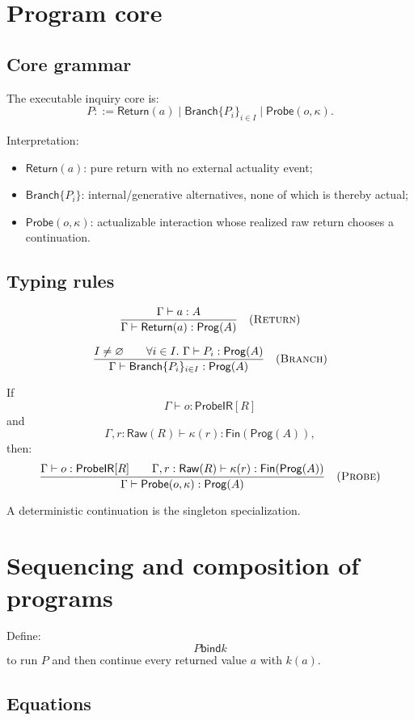 \documentclass[11pt,oneside]{article}
\newcommand{\Prog}{\mathsf{Prog}}
\newcommand{\Raw}{\mathsf{Raw}}
\newcommand{\ProbeIR}{\mathsf{ProbeIR}}
\newcommand{\bind}{\mathbin{\mathsf{bind}}}
\begin{document}
\section{Program core}

\subsection{Core grammar}

The executable inquiry core is:
\[
\boxed{
P::=
\mathsf{Return}(a)
\mid
\mathsf{Branch}\{P_i\}_{i\in I}
\mid
\mathsf{Probe}(o,\kappa).
}
\]

Interpretation:
\begin{itemize}
\item \(\mathsf{Return}(a)\): pure return with no external actuality event;
\item \(\mathsf{Branch}\{P_i\}\): internal/generative alternatives, none of which is thereby actual;
\item \(\mathsf{Probe}(o,\kappa)\): actualizable interaction whose realized raw return chooses a continuation.
\end{itemize}

\subsection{Typing rules}

\[
\frac{\Gamma\vdash a:A}
{\Gamma\vdash\mathsf{Return}(a):\Prog(A)}
\quad(\textsc{Return})
\]

\[
\frac{
I\neq\varnothing
\qquad
\forall i\in I.\ \Gamma\vdash P_i:\Prog(A)
}{
\Gamma\vdash\mathsf{Branch}\{P_i\}_{i\in I}:\Prog(A)
}
\quad(\textsc{Branch})
\]

If
\[
\Gamma\vdash o:\ProbeIR[R]
\]
and
\[
\Gamma,r:\Raw(R)\vdash\kappa(r):\mathsf{Fin}(\Prog(A)),
\]
then:
\[
\frac{
\Gamma\vdash o:\ProbeIR[R]
\qquad
\Gamma,r:\Raw(R)\vdash\kappa(r):\mathsf{Fin}(\Prog(A))
}{
\Gamma\vdash\mathsf{Probe}(o,\kappa):\Prog(A)
}
\quad(\textsc{Probe})
\]

A deterministic continuation is the singleton specialization.

\section{Sequencing and composition of programs}

Define:
\[
P\bind k
\]
to run \(P\) and then continue every returned value \(a\) with \(k(a)\).

\subsection{Equations}
\end{document}
